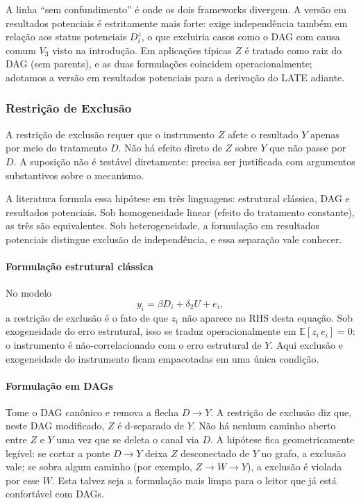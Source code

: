 \documentclass[
]{article}
\begin{document}
A linha ``sem confundimento'' é onde os dois frameworks divergem. A versão em resultados potenciais é estritamente mais forte: exige independência também em relação aos status potenciais \(D^z_i\), o que excluiria casos como o DAG com causa comum \(V_3\) visto na introdução. Em aplicações típicas \(Z\) é tratado como raiz do DAG (sem parents), e as duas formulações coincidem operacionalmente; adotamos a versão em resultados potenciais para a derivação do LATE adiante.

\subsubsection{Restrição de Exclusão}\label{restricao-de-exclusao}

A restrição de exclusão requer que o instrumento \(Z\) afete o resultado \(Y\) apenas por meio do tratamento \(D\). Não há efeito direto de \(Z\) sobre \(Y\) que não passe por \(D\). A suposição não é testável diretamente: precisa ser justificada com argumentos substantivos sobre o mecanismo.

A literatura formula essa hipótese em três linguagens: estrutural clássica, DAG e resultados potenciais. Sob homogeneidade linear (efeito do tratamento constante), as três são equivalentes. Sob heterogeneidade, a formulação em resultados potenciais distingue exclusão de independência, e essa separação vale conhecer.

\paragraph{Formulação estrutural clássica}\label{formulauxe7uxe3o-estrutural-cluxe1ssica}

No modelo
\[y_i = \beta D_i + \delta_2 U + e_i,\]
a restrição de exclusão é o fato de que \(z_i\) não aparece no RHS desta equação. Sob exogeneidade do erro estrutural, isso se traduz operacionalmente em \(\mathbb{E}[z_i \, e_i] = 0\): o instrumento é não-correlacionado com o erro estrutural de \(Y\). Aqui exclusão e exogeneidade do instrumento ficam empacotadas em uma única condição.

\paragraph{Formulação em DAGs}\label{formulauxe7uxe3o-em-dags}

Tome o DAG canônico e remova a flecha \(D \to Y\). A restrição de exclusão diz que, neste DAG modificado, \(Z\) é d-separado de \(Y\). Não há nenhum caminho aberto entre \(Z\) e \(Y\) uma vez que se deleta o canal via \(D\). A hipótese fica geometricamente legível: se cortar a ponte \(D \to Y\) deixa \(Z\) desconectado de \(Y\) no grafo, a exclusão vale; se sobra algum caminho (por exemplo, \(Z \to W \to Y\)), a exclusão é violada por esse \(W\). Esta talvez seja a formulação mais limpa para o leitor que já está confortável com DAGs.
\end{document}
